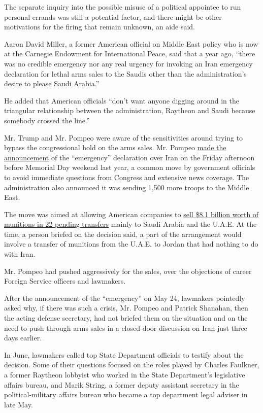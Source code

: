 The separate inquiry into the possible misuse of a political appointee
to run personal errands was still a potential factor, and there might be
other motivations for the firing that remain unknown, an aide said.

Aaron David Miller, a former American official on Middle East policy who
is now at the Carnegie Endowment for International Peace, said that a
year ago, ``there was no credible emergency nor any real urgency for
invoking an Iran emergency declaration for lethal arms sales to the
Saudis other than the administration's desire to please Saudi Arabia.''

He added that American officials ``don't want anyone digging around in
the triangular relationship between the administration, Raytheon and
Saudi because somebody crossed the line.''

Mr. Trump and Mr. Pompeo were aware of the sensitivities around trying
to bypass the congressional hold on the arms sales. Mr. Pompeo
\href{https://www.nytimes.com/2019/05/24/world/middleeast/trump-troop-increase-middle-east-iran.html}{made
the announcement} of the ``emergency'' declaration over Iran on the
Friday afternoon before Memorial Day weekend last year, a common move by
government officials to avoid immediate questions from Congress and
extensive news coverage. The administration also announced it was
sending 1,500 more troops to the Middle East.

The move was aimed at allowing American companies to
\href{https://www.nytimes.com/2019/05/23/us/politics/trump-saudi-arabia-arms-sales.html}{sell
\$8.1 billion worth of munitions in 22 pending transfers} mainly to
Saudi Arabia and the U.A.E. At the time, a person briefed on the
decision said, a part of the arrangement would involve a transfer of
munitions from the U.A.E. to Jordan that had nothing to do with Iran.

Mr. Pompeo had pushed aggressively for the sales, over the objections of
career Foreign Service officers and lawmakers.

After the announcement of the ``emergency'' on May 24, lawmakers
pointedly asked why, if there was such a crisis, Mr. Pompeo and Patrick
Shanahan, then the acting defense secretary, had not briefed them on the
situation and on the need to push through arms sales in a closed-door
discussion on Iran just three days earlier.

In June, lawmakers called top State Department officials to testify
about the decision. Some of their questions focused on the roles played
by Charles Faulkner, a former Raytheon lobbyist who worked in the State
Department's legislative affairs bureau, and Marik String, a former
deputy assistant secretary in the political-military affairs bureau who
became a top department legal adviser in late May.


